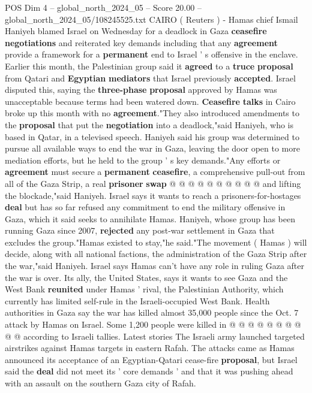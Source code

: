 \begin{textsample}{POS Dim 4 – global\_north\_2024\_05 – Score 20.00 – global\_north\_2024\_05/108245525.txt}  \label{ex:f4_pos_348}
CAIRO ( Reuters ) - Hamas chief Ismail Haniyeh blamed Israel on Wednesday for a deadlock in Gaza \textbf{ceasefire} \textbf{negotiations} and reiterated key demands including that any \textbf{agreement} provide a framework for a \textbf{permanent} end to Israel ' s offensive in the enclave.
Earlier this month, the Palestinian group said it \textbf{agreed} to a \textbf{truce} \textbf{proposal} from Qatari and \textbf{Egyptian} \textbf{mediators} that Israel previously \textbf{accepted}.
Israel disputed this, saying the \textbf{three-phase} \textbf{proposal} approved by Hamas was unacceptable because terms had been watered down. \textbf{Ceasefire} \textbf{talks} in Cairo broke up this month with no \textbf{agreement}."They also introduced amendments to the \textbf{proposal} that put the \textbf{negotiation} into a deadlock,"said Haniyeh, who is based in Qatar, in a televised speech.
Haniyeh said his group was determined to pursue all available ways to end the war in Gaza, leaving the door open to more mediation efforts, but he held to the group ' s key demands."Any efforts or \textbf{agreement} must secure a \textbf{permanent} \textbf{ceasefire}, a comprehensive pull-out from all of the Gaza Strip, a real \textbf{prisoner} \textbf{swap} @ @ @ @ @ @ @ @ @ @ and lifting the blockade,"said Haniyeh.
Israel says it wants to reach a prisoners-for-hostages \textbf{deal} but has so far refused any commitment to end the military offensive in Gaza, which it said seeks to annihilate Hamas.
Haniyeh, whose group has been running Gaza since 2007, \textbf{rejected} any post-war settlement in Gaza that excludes the group."Hamas existed to stay,"he said."The movement ( Hamas ) will decide, along with all national factions, the administration of the Gaza Strip after the war,"said Haniyeh.
Israel says Hamas can't have any role in ruling Gaza after the war is over.
Its ally, the United States, says it wants to see Gaza and the West Bank \textbf{reunited} under Hamas ' rival, the Palestinian Authority, which currently has limited self-rule in the Israeli-occupied West Bank.
Health authorities in Gaza say the war has killed almost 35,000 people since the Oct. 7 attack by Hamas on Israel.
Some 1,200 people were killed in @ @ @ @ @ @ @ @ @ @ according to Israeli tallies.
Latest stories The Israeli army launched targeted airstrikes against Hamas targets in eastern Rafah.
The attacks came as Hamas announced its acceptance of an Egyptian-Qatari cease-fire \textbf{proposal}, but Israel said the \textbf{deal} did not meet its ' core demands ' and that it was pushing ahead with an assault on the southern Gaza city of Rafah.

\end{textsample}
